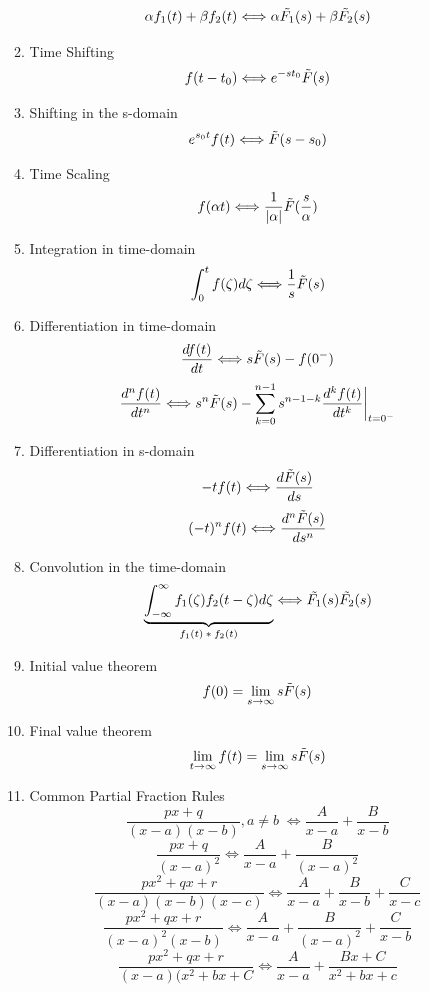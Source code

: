 \begin{enumerate}
\begin{enumerate}
        \[\alpha f_1(t)+\beta f_2(t) \Longleftrightarrow \alpha \tilde{F_1}(s) + \beta\Tilde{F_2}(s)\]
        \item Time Shifting
        \[f(t-t_0) \Longleftrightarrow e^{-st_0}\Tilde{F}(s)\]
        \item Shifting in the s-domain 
        \[e^{s_0t}f(t) \Longleftrightarrow \Tilde{F}(s-s_0)\]
        \item Time Scaling
        \[f(\alpha t) \Longleftrightarrow \frac{1}{|\alpha|}\Tilde{F}(\frac{s}{\alpha})\]
        \item Integration in time-domain
        \[\int^t_0f(\zeta)d\zeta \Longleftrightarrow \frac{1}{s}\Tilde{F}(s)\]
        \item Differentiation in time-domain
        \[\frac{df(t)}{dt} \Longleftrightarrow s\Tilde{F}(s)-f(0^-)\]
        \[\frac{d^nf(t)}{dt^n} \Longleftrightarrow s^n\Tilde{F}(s)-\sum^{n-1}_{k=0}s^{n-1-k}\frac{d^kf(t)}{dt^k}\bigg|_{t=0^-}\]
        \item Differentiation in s-domain
        \[-tf(t) \Longleftrightarrow \frac{d\Tilde{F}(s)}{ds}\]
        \[(-t)^nf(t) \Longleftrightarrow \frac{d^n\Tilde{F}(s)}{ds^n}\]
        \item Convolution in the time-domain
        \[\underbrace{\int^{\infty}_{-\infty}f_1(\zeta)f_2(t-\zeta)d\zeta}_\text{$f_1(t)*f_2(t)$} \Longleftrightarrow \Tilde{F_1}(s)\Tilde{F_2}(s)\]
        \item Initial value theorem
        \[f(0) = \lim_{s\rightarrow \infty}s\Tilde{F}(s)\]
        \item Final value theorem
        \[\lim_{t\rightarrow\infty}f(t) = \lim_{s\rightarrow\infty}s\Tilde{F}(s)\]
        \item Common Partial Fraction Rules
        \[\frac{px+q}{(x-a)(x-b)}, a\neq b \; \Longleftrightarrow \frac{A}{x-a}+\frac{B}{x-b}\]
        \[\frac{px+q}{(x-a)^2} \Longleftrightarrow \frac{A}{x-a}+\frac{B}{(x-a)^2}\]
        \[\frac{px^2+qx+r}{(x-a)(x-b)(x-c)} \Longleftrightarrow \frac{A}{x-a}+\frac{B}{x-b}+\frac{C}{x-c}\]
        \[\frac{px^2+qx+r}{(x-a)^2(x-b)} \Longleftrightarrow \frac{A}{x-a}+\frac{B}{(x-a)^2}+\frac{C}{x-b}\]
        \[\frac{px^2+qx+r}{(x-a)(x^2+bx+C} \Longleftrightarrow \frac{A}{x-a}+\frac{Bx+C}{x^2+bx+c}\]
    \end{enumerate}
\end{enumerate}
